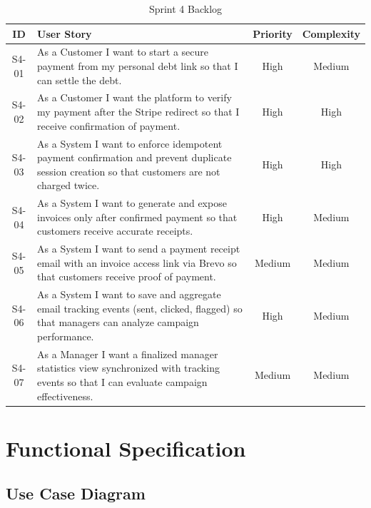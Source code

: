 \documentclass[12pt,a4paper]{report}
\begin{document}
\begin{table}[H]
  \centering
  \renewcommand{\arraystretch}{1.3}
  \begin{tabular}{|c|p{8cm}|c|c|}
    \hline
    \textbf{ID} & \textbf{User Story} & \textbf{Priority} & \textbf{Complexity} \\
    \hline
    S4-01 & As a Customer I want to start a secure payment from my personal debt link so that I can settle the debt.                          & High   & Medium \\
    \hline
    S4-02 & As a Customer I want the platform to verify my payment after the Stripe redirect so that I receive confirmation of payment.       & High   & High \\
    \hline
    S4-03 & As a System I want to enforce idempotent payment confirmation and prevent duplicate session creation so that customers are not charged twice.                   & High   & High \\
    \hline
    S4-04 & As a System I want to generate and expose invoices only after confirmed payment so that customers receive accurate receipts.                                & High   & Medium \\
    \hline
    S4-05 & As a System I want to send a payment receipt email with an invoice access link via Brevo so that customers receive proof of payment.                       & Medium & Medium \\
    \hline
    S4-06 & As a System I want to save and aggregate email tracking events (sent, clicked, flagged) so that managers can analyze campaign performance.                   & High   & Medium \\
    \hline
    S4-07 & As a Manager I want a finalized manager statistics view synchronized with tracking events so that I can evaluate campaign effectiveness.                  & Medium & Medium \\
    \hline
  \end{tabular}
  \caption{Sprint 4 Backlog}
  \label{tab:s4-backlog}
\end{table}

\section{Functional Specification}

\subsection{Use Case Diagram}
\end{document}
